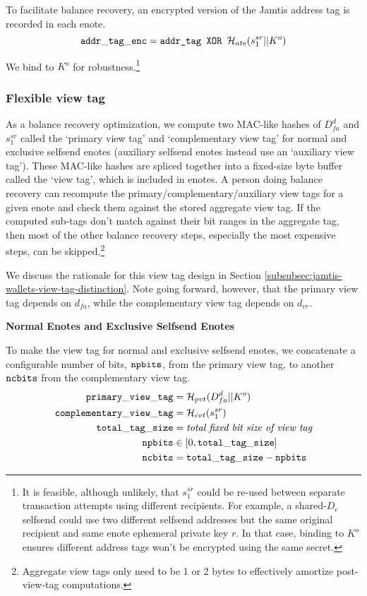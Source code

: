 To facilitate balance recovery, an encrypted version of the Jamtis address tag is recorded in each enote.
\[ {\tt addr\_tag\_enc} = \textrm{\tt addr\_tag XOR } \mathcal{H}_{ate}(s^{sr}_1 || K^o) \]

We bind to $K^o$ for robustness.\footnote{It is feasible, although unlikely, that $s^{sr}_1$ could be re-used between separate transaction attempts using different recipients. For example, a shared-$D_e$ selfsend could use two different selfsend addresses but the same original recipient and same enote ephemeral private key $r$. In that case, binding to $K^o$ ensures different address tags won't be encrypted using the same secret.}

\subsubsection{Flexible view tag}
\label{subsubsec:jamtis-enote-construction-view-tag}

As a balance recovery optimization, we compute two MAC-like hashes of $D^d_{fa}$ and $s^{sr}_1$ called the `primary view tag' and `complementary view tag' \cite{reduce-scan-times-view-tag-research-issue-73} for normal and exclusive selfsend enotes (auxiliary selfsend enotes instead use an `auxiliary view tag'). These MAC-like hashes are spliced together into a fixed-size byte buffer called the `view tag', which is included in enotes. A person doing balance recovery can recompute the primary/complementary/auxiliary view tags for a given enote and check them against the stored aggregate view tag. If the computed sub-tags don't match against their bit ranges in the aggregate tag, then most of the other balance recovery steps, especially the most expensive steps, can be skipped.\footnote{Aggregate view tags only need to be 1 or 2 bytes to effectively amortize post-view-tag computations.}

We discuss the rationale for this view tag design in Section \ref{subsubsec:jamtis-wallets-view-tag-distinction}. Note going forward, however, that the primary view tag depends on $d_{fa}$, while the complementary view tag depends on $d_{vr}$.

\textbf{Normal Enotes and Exclusive Selfsend Enotes}

To make the view tag for normal and exclusive selfsend enotes, we concatenate a configurable number of bits, ${\tt npbits}$, from the primary view tag, to another ${\tt ncbits}$ from the complementary view tag.
\begin{align*}
    {\tt primary\_view\_tag} &= \mathcal{H}_{pvt}(D^d_{fa} || K^o) \\
    {\tt complementary\_view\_tag} &= \mathcal{H}_{cvt}(s^{sr}_1) \\
    {\tt total\_tag\_size} &= \textit{total fixed bit size of view tag} \\
    {\tt npbits} &\in [0, {\tt total\_tag\_size}] \\
    {\tt ncbits} &= {\tt total\_tag\_size} - {\tt npbits} \\
\end{align*}

